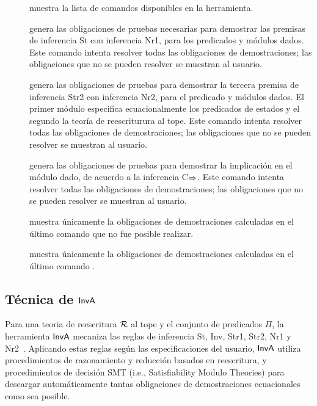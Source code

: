 \begin{description}
 \item[] muestra la lista de comandos disponibles en la
  herramienta.
 \item[] genera las
  obligaciones de pruebas necesarias para demostrar las premisas de
  inferencia {\sc St} con inferencia {\sc Nr1}, para los predicados y
  módulos dados. Este comando intenta resolver todas las obligaciones de
  demostraciones; las obligaciones que no se pueden resolver se muestran
  al usuario.
 \item[]  genera las obligaciones de pruebas para demostrar la tercera
  premisa de inferencia {\sc Str2} con inferencia {\sc Nr2}, para el
  predicado y módulos dados. El primer módulo especifica ecuacionalmente
  los predicados de estados y el segundo la teoría de reescriturura
  al tope. Este comando intenta resolver todas las obligaciones de
  demostraciones; las obligaciones que no se pueden resolver se muestran
  al usuario.
 \item[]
  genera las obligaciones de pruebas para demostrar la implicación
  en el módulo dado, de acuerdo a la inferencia {\sc C$\Rightarrow$}. Este
  comando intenta resolver todas las obligaciones de demostraciones; las
  obligaciones que no se pueden resolver se muestran al usuario.
 \item[] muestra únicamente la obligaciones de
  demostraciones calculadas en el último comando  que no
  fue posible realizar.
 \item[] muestra únicamente la obligaciones de
  demostraciones calculadas en el último comando . 
\end{description}

\subsection{Técnica de ${\sf InvA}$}
\label{ti.prelim}

Para una teoria de reescritura $\mathcal{R}$ al tope y el conjunto de
predicados $\Pi$, la herramienta ${\sf InvA}$ mecaniza las reglas de
inferencia {\sc St}, {\sc Inv}, {\sc Str1}, {\sc Str2}, {\sc Nr1} y
{\sc Nr2}~\cite{thesis-rocha}. Aplicando estas reglas según las
especificaciones del usuario, ${\sf InvA}$ utiliza procedimientos de
razonamiento y reducción basados en reescritura, y procedimientos de
decisión SMT (i.e., Satisfiability Modulo Theories) para descargar
automáticamente tantas obligaciones de demostraciones ecuacionales como
sea posible.

